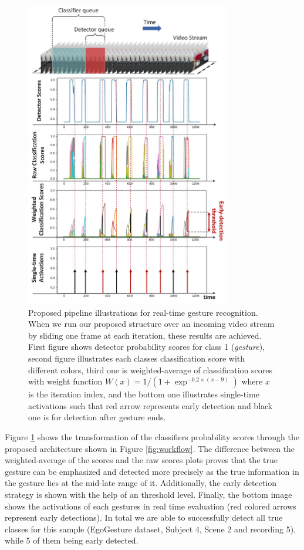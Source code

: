 \begin{figure}[H]
	\centering 
	\includegraphics[width=0.8\textwidth]{figures/probs}
	\caption{Proposed pipeline illustrations for real-time gesture recognition. When we run our proposed structure over an incoming video stream by sliding one frame at each iteration, these results are achieved. First figure shows detector probability scores for class 1 (\textit{gesture}), second figure illustrates each classes classification score with different colors, third one is weighted-average of classification scores with weight function $W(x) = 1/(1+\exp^{-0.2\times(x-9)})$ where $x$ is the iteration index, and the bottom one illustrates single-time activations such that red arrow represents early detection and black one is for detection after gesture ends.}
	\label{fig:probs}
\end{figure}

Figure \ref{fig:probs} shows the transformation of the classifiers probability scores through the proposed architecture shown in Figure \ref{fig:workflow}. The difference between the weighted-average of the scores and the raw scores plots proves that the true gesture can be emphasized and detected more precisely as the true information in the gesture lies at the mid-late range of it. Additionally, the early detection strategy is shown with the help of an threshold level. Finally, the bottom image shows the activations of each gestures in real time evaluation (red colored arrows represent early detections). In total we are able to successfully detect all true classes for this sample (EgoGesture dataset, Subject 4, Scene 2 and recording 5), while 5 of them being early detected.\\
